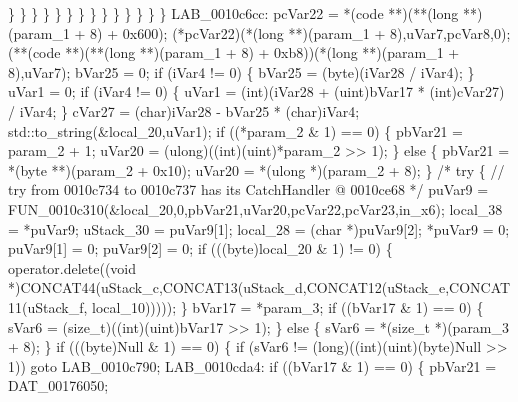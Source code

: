 \documentclass[
]{article}
\newenvironment{Shaded}{}{}
\newcommand{\NormalTok}[1]{#1}
\begin{document}
\begin{Shaded}
\begin{Highlighting}[]
\NormalTok{                            \}}
\NormalTok{                          \}}
\NormalTok{                        \}}
\NormalTok{                      \}}
\NormalTok{                    \}}
\NormalTok{                  \}}
\NormalTok{                \}}
\NormalTok{              \}}
\NormalTok{            \}}
\NormalTok{          \}}
\NormalTok{        \}}
\NormalTok{      \}}
\NormalTok{    \}}
\NormalTok{  \}}
\NormalTok{LAB\_0010c6cc:}
\NormalTok{  pcVar22 = *(code **)(**(long **)(param\_1 + 8) + 0x600);}
\NormalTok{  (*pcVar22)(*(long **)(param\_1 + 8),uVar7,pcVar8,0);}
\NormalTok{  (**(code **)(**(long **)(param\_1 + 8) + 0xb8))(*(long **)(param\_1 + 8),uVar7);}
\NormalTok{  bVar25 = 0;}
\NormalTok{  if (iVar4 != 0) \{}
\NormalTok{    bVar25 = (byte)(iVar28 / iVar4);}
\NormalTok{  \}}
\NormalTok{  uVar1 = 0;}
\NormalTok{  if (iVar4 != 0) \{}
\NormalTok{    uVar1 = (int)(iVar28 + (uint)bVar17 * (int)cVar27) / iVar4;}
\NormalTok{  \}}
\NormalTok{  cVar27 = (char)iVar28 {-} bVar25 * (char)iVar4;}
\NormalTok{  std::to\_string(\&local\_20,uVar1);}
\NormalTok{  if ((*param\_2 \& 1) == 0) \{}
\NormalTok{    pbVar21 = param\_2 + 1;}
\NormalTok{    uVar20 = (ulong)((int)(uint)*param\_2 \textgreater{}\textgreater{} 1);}
\NormalTok{  \}}
\NormalTok{  else \{}
\NormalTok{    pbVar21 = *(byte **)(param\_2 + 0x10);}
\NormalTok{    uVar20 = *(ulong *)(param\_2 + 8);}
\NormalTok{  \}}
\NormalTok{                    /* try \{ // try from 0010c734 to 0010c737 has its CatchHandler @ 0010ce68 */}
\NormalTok{  puVar9 = FUN\_0010c310(\&local\_20,0,pbVar21,uVar20,pcVar22,pcVar23,in\_x6);}
\NormalTok{  local\_38 = *puVar9;}
\NormalTok{  uStack\_30 = puVar9[1];}
\NormalTok{  local\_28 = (char *)puVar9[2];}
\NormalTok{  *puVar9 = 0;}
\NormalTok{  puVar9[1] = 0;}
\NormalTok{  puVar9[2] = 0;}
\NormalTok{  if (((byte)local\_20 \& 1) != 0) \{}
\NormalTok{    operator.delete((void *)CONCAT44(uStack\_c,CONCAT13(uStack\_d,CONCAT12(uStack\_e,CONCAT11(uStack\_f,}
\NormalTok{                                                  local\_10)))));}
\NormalTok{  \}}
\NormalTok{  bVar17 = *param\_3;}
\NormalTok{  if ((bVar17 \& 1) == 0) \{}
\NormalTok{    sVar6 = (size\_t)((int)(uint)bVar17 \textgreater{}\textgreater{} 1);}
\NormalTok{  \}}
\NormalTok{  else \{}
\NormalTok{    sVar6 = *(size\_t *)(param\_3 + 8);}
\NormalTok{  \}}
\NormalTok{  if (((byte)Null \& 1) == 0) \{}
\NormalTok{    if (sVar6 != (long)((int)(uint)(byte)Null \textgreater{}\textgreater{} 1)) goto LAB\_0010c790;}
\NormalTok{LAB\_0010cda4:}
\NormalTok{    if ((bVar17 \& 1) == 0) \{}
\NormalTok{      pbVar21 = DAT\_00176050;}

\end{Highlighting}
\end{Shaded}
\end{document}
